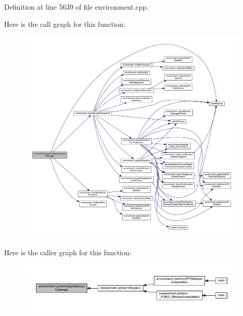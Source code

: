 Definition at line 5639 of file environment.\+cpp.



Here is the call graph for this function\+:\nopagebreak
\begin{figure}[H]
\begin{center}
\leavevmode
\includegraphics[width=350pt]{a00013_a4949138a3771b7f6ec2bfe82cbad947e_cgraph}
\end{center}
\end{figure}




Here is the caller graph for this function\+:\nopagebreak
\begin{figure}[H]
\begin{center}
\leavevmode
\includegraphics[width=350pt]{a00013_a4949138a3771b7f6ec2bfe82cbad947e_icgraph}
\end{center}
\end{figure}


